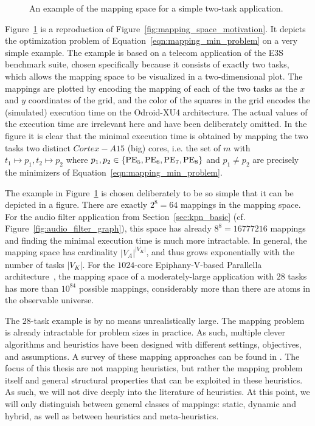 \begin{figure}[h]
	\centering
\resizebox{0.95\textwidth}{!}{
   \begin{tikzpicture}
     
   \end{tikzpicture}
 }
   \caption{An example of the mapping space for a simple two-task application.}
   \label{fig:mapping_space_example}
\end{figure}

Figure~\ref{fig:mapping_space_example} is a reproduction of Figure~\ref{fig:mapping_space_motivation}. It depicts the optimization problem of Equation~\ref{eqn:mapping_min_problem} on a very simple example.
The example is based on a telecom application of the E3S benchmark suite, chosen specifically because it consists of exactly two tasks, which allows the mapping space to be visualized in a two-dimensional plot.
The mappings are plotted by encoding the mapping of each of the two tasks as the $x$ and $y$ coordinates of the grid, and the color of the squares in the grid encodes the (simulated) execution time on the Odroid-XU4 architecture.
The actual values of the execution time are irrelevant here and have been deliberately omitted. In the figure it is clear that the minimal execution time is obtained by mapping the two tasks two distinct $Cortex-A15$ (big) cores,
i.e. the set of $m$ with $t_1 \mapsto p_1, t_2 \mapsto p_2$ where $p_1,p_2 \in \{\operatorname{PE}_5,\operatorname{PE}_6,\operatorname{PE}_7,\operatorname{PE}_8\}$ and $p_1 \neq p_2$ are precisely the minimizers of Equation~\ref{eqn:mapping_min_problem}.

The example in Figure~\ref{fig:mapping_space_example} is chosen deliberately to be so simple that it can be depicted in a figure.
There are exactly $2^8 = 64$ mappings in the mapping space.
For the audio filter application from Section~\ref{sec:kpn_basic} (cf. Figure~\ref{fig:audio_filter_graph}), this space has already $8^8 = 16777216$ mappings and finding the minimal execution time is much more intractable.
In general, the mapping space has cardinality $|V_A|^{|V_K|}$, and thus grows exponentially with the number of tasks $|V_K|$.
For the $1024$-core Epiphany-V-based Parallella architecture~\cite{parallella}, the mapping space of a moderately-large application with $28$ tasks has more than $10^{84}$ possible mappings, considerably more than there are atoms in the observable universe.

The $28$-task example is by no means unrealistically large. The mapping problem is already intractable for problem sizes in practice. As such, multiple clever algorithms and heuristics have been designed with different settings, objectives, and assumptions.
A survey of these mapping approaches can be found in \cite{singh2013mapping}.
The focus of this thesis are not mapping heuristics, but rather the mapping problem itself and general structural properties that can be exploited in these heuristics.
As such, we will not dive deeply into the literature of heuristics. At this point, we will only distinguish between general classes of mappings: static, dynamic and hybrid, as well as between heuristics and meta-heuristics. 

